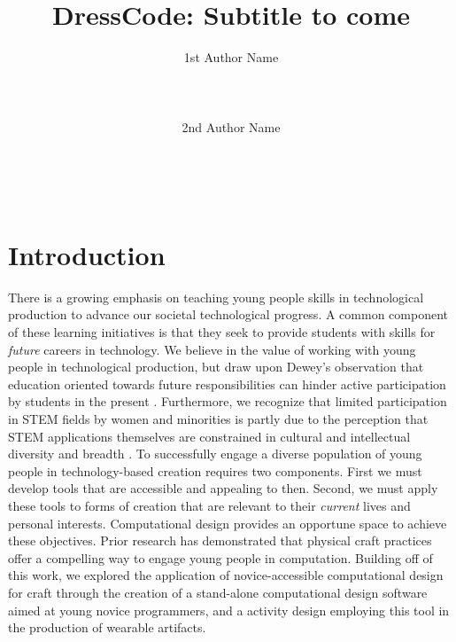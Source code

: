 \documentclass{sigchi}
\begin{document}
\title{DressCode: Subtitle to come}

\author{
 \alignauthor 1st Author Name\\
  \\
  \\
  \\
 \alignauthor 2nd Author Name\\
  \\
  \\
  \\
}

\maketitle

\begin{abstract}
\end{abstract}



\section{Introduction} %
There is a growing emphasis on teaching young people skills in technological production to advance our societal technological progress. A common component of these learning initiatives is that they seek to provide students with skills for \textit{future} careers in technology. We believe in the value of working with young people in technological production, but draw upon Dewey's observation that education oriented towards future responsibilities can hinder active participation by students in the present \cite{dewey}. Furthermore, we recognize that limited participation in STEM fields by women and minorities is partly due to the perception that STEM applications themselves are constrained in cultural and intellectual diversity and breadth \cite{buechley_wild}. To successfully engage a diverse population of young people in technology-based creation requires two components. First we must develop tools that are accessible and appealing to then.  Second, we must apply these tools to forms of creation that are relevant to their \emph{current} lives and personal interests. Computational design provides an opportune space to achieve these objectives. Prior research has demonstrated that physical craft practices offer a compelling way to engage young people in computation. Building off of this work, we explored the application of novice-accessible computational design for craft through the creation of a stand-alone computational design software aimed at young novice programmers, and a activity design employing this tool in the production of wearable artifacts.
\end{document}
